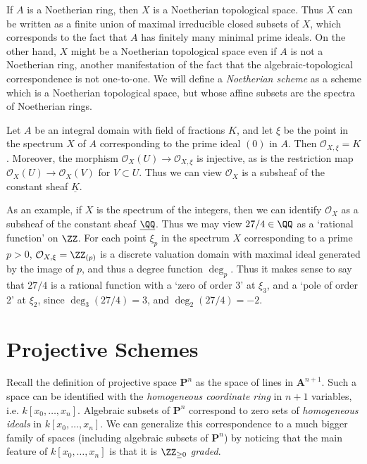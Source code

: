 If $A$ is a Noetherian ring, then $X$ is a Noetherian topological space. Thus $X$ can be written as a finite union of maximal irreducible closed subsets of $X$, which corresponds to the fact that $A$ has finitely many minimal prime ideals. On the other hand, $X$ might be a Noetherian topological space even if $A$ is not a Noetherian ring, another manifestation of the fact that the algebraic-topological correspondence is not one-to-one. We will define a \emph{Noetherian scheme} as a scheme which is a Noetherian topological space, but whose affine subsets are the spectra of Noetherian rings.

Let $A$ be an integral domain with field of fractions $K$, and let $\xi$ be the point in the spectrum $X$ of $A$ corresponding to the prime ideal $(0)$ in $A$. Then $\mathcal{O}_{X,\xi} = K$. Moreover, the morphism $\mathcal{O}_X(U) \to \mathcal{O}_{X,\xi}$ is injective, as is the restriction map $\mathcal{O}_X(U) \to \mathcal{O}_X(V)$ for $V \subset U$. Thus we can view $\mathcal{O}_X$ is a subsheaf of the constant sheaf $\underline{K}$.

As an example, if $X$ is the spectrum of the integers, then we can identify $\mathcal{O}_X$ as a subsheaf of the constant sheaf $\underline{\QQ}$. Thus we may view $27/4 \in \QQ$ as a `rational function' on $\ZZ$. For each point $\xi_p$ in the spectrum $X$ corresponding to a prime $p > 0$, $\mathcal{O}_{X,\xi} = \ZZ_{(p)}$ is a discrete valuation domain with maximal ideal generated by the image of $p$, and thus a degree function $\deg_p$. Thus it makes sense to say that $27/4$ is a rational function with a `zero of order 3' at $\xi_3$, and a `pole of order 2' at $\xi_2$, since $\deg_3(27/4) = 3$, and $\deg_2(27/4) = -2$.

\section{Projective Schemes}
 
Recall the definition of projective space $\mathbf{P}^n$ as the space of lines in $\mathbf{A}^{n+1}$. Such a space can be identified with the \emph{homogeneous coordinate ring} in $n+1$ variables, i.e. $k[x_0,\dots,x_n]$. Algebraic subsets of $\mathbf{P}^n$ correspond to zero sets of \emph{homogeneous ideals} in $k[x_0,\dots,x_n]$. We can generalize this correspondence to a much bigger family of spaces (including algebraic subsets of $\mathbf{P}^n$) by noticing that the main feature of $k[x_0,\dots,x_n]$ is that it is $\ZZ_{\geq 0}$ \emph{graded}.

